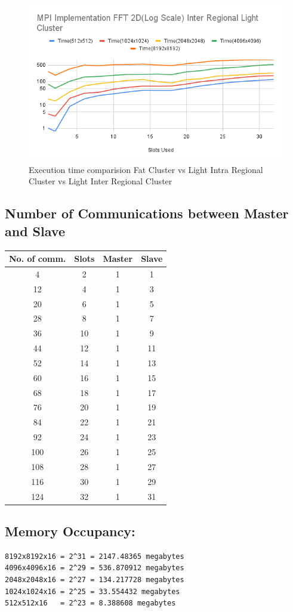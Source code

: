 \documentclass{article}
\begin{document}
\begin{figure}[hb]
    \includegraphics[width=.48\textwidth]{MPI Implementation FFT 2D(Log Scale) Inter Regional Light Cluster.png}
    \caption{Execution time comparision Fat Cluster vs Light Intra Regional Cluster vs Light Inter Regional Cluster}\label{fig:foobar}
\end{figure}
\newpage
\subsection{Number of Communications between Master and Slave}

\begin{tabular}{|c|c|c|c|}
\hline
No. of comm. & Slots & Master & Slave \\
\hline
4   & 2 & 1 & 1 \\
\hline
12  & 4 & 1 & 3 \\
\hline
20  & 6 & 1 & 5 \\
\hline
28  & 8 & 1 & 7 \\
\hline
36  & 10 & 1 & 9 \\
\hline
44  & 12 & 1 & 11 \\
\hline
52  & 14 & 1 & 13 \\
\hline
60  & 16 & 1 & 15 \\
\hline
68  & 18 & 1 & 17 \\
\hline
76  & 20 & 1 & 19 \\
\hline
84  & 22 & 1 & 21 \\
\hline
92  & 24 & 1 & 23 \\
\hline
100 & 26 & 1 & 25 \\
\hline
108 & 28 & 1 & 27 \\
\hline
116 & 30 & 1 & 29 \\
\hline
124 & 32 & 1 & 31 \\
\hline
\end{tabular}



\subsection{Memory Occupancy: }
\begin{verbatim}
8192x8192x16 = 2^31 = 2147.48365 megabytes
4096x4096x16 = 2^29 = 536.870912 megabytes
2048x2048x16 = 2^27 = 134.217728 megabytes
1024x1024x16 = 2^25 = 33.554432 megabytes
512x512x16   = 2^23 = 8.388608 megabytes    
\end{verbatim}
\end{document}
